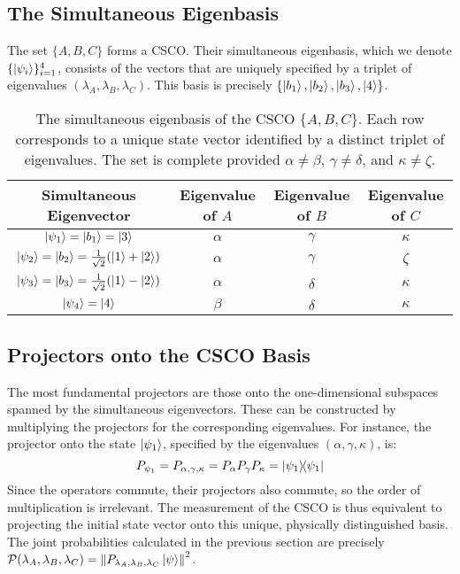 \documentclass[11pt,a4paper]{article}
\begin{document}
  \subsection{The Simultaneous Eigenbasis}
  The set $\{A, B, C\}$ forms a CSCO. Their simultaneous eigenbasis, which we
  denote $\{\ket{\psi_i}\}_{i=1}^4$, consists of the vectors that are uniquely
  specified by a triplet of eigenvalues $(\lambda_A, \lambda_B, \lambda_C)$. This
  basis is precisely $\{\ket{b_1}, \ket{b_2}, \ket{b_3}, \ket{4}\}$.

  \begin{table}[ht!]
    \centering
    \renewcommand{\arraystretch}{1.5}
    \begin{tabular}{c | c c c}
      \hline\hline
      \textbf{Simultaneous Eigenvector} & \textbf{Eigenvalue of $A$} &
      \textbf{Eigenvalue of $B$} & \textbf{Eigenvalue of $C$} \\
      \hline
      $\ket{\psi_1} = \ket{b_1} = \ket{3}$ & $\alpha$ & $\gamma$ & $\kappa$ \\
      $\ket{\psi_2} = \ket{b_2} = \frac{1}{\sqrt{2}}(\ket{1}+\ket{2})$ & $\alpha$ & $\gamma$ & $\zeta$ \\
      $\ket{\psi_3} = \ket{b_3} = \frac{1}{\sqrt{2}}(\ket{1}-\ket{2})$ & $\alpha$ & $\delta$ & $\kappa$ \\
      $\ket{\psi_4} = \ket{4}$ & $\beta$ & $\delta$ & $\kappa$ \\
      \hline\hline
    \end{tabular}
    \caption{The simultaneous eigenbasis of the CSCO $\{A, B, C\}$. Each row
      corresponds to a unique state vector identified by a distinct triplet of
      eigenvalues. The set is complete provided $\alpha \neq \beta$, $\gamma \neq
    \delta$, and $\kappa \neq \zeta$.}
    \label{tab:csco_summary}
  \end{table}

  \subsection{Projectors onto the CSCO Basis}
  The most fundamental projectors are those onto the one-dimensional subspaces
  spanned by the simultaneous eigenvectors. These can be constructed by
  multiplying the projectors for the corresponding eigenvalues. For instance, the
  projector onto the state $\ket{\psi_1}$, specified by the eigenvalues $(\alpha,
  \gamma, \kappa)$, is:
  $$ P_{\psi_1} = P_{\alpha,\gamma,\kappa} = P_\alpha P_\gamma P_\kappa =
  \dyad{\psi_1}{\psi_1}$$
  Since the operators commute, their projectors also commute, so the order of
  multiplication is irrelevant. The measurement of the CSCO is thus equivalent to
  projecting the initial state vector onto this unique, physically distinguished
  basis. The joint probabilities calculated in the previous section are precisely
  $\mathcal{P}(\lambda_A, \lambda_B, \lambda_C) =
  \norm{P_{\lambda_A,\lambda_B,\lambda_C}\ket{\psi}}^2$.
\end{document}
